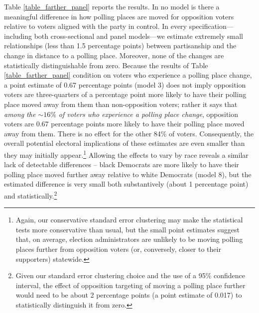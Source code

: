 \documentclass[12pt]{article}
\begin{document}
Table \ref{table_farther_panel} reports the results. In no model is there a meaningful difference in how polling places are moved for opposition voters relative to voters aligned with the party in control.  In every specification---including both cross-sectional and panel models---we estimate extremely small relationships (less than 1.5 percentage points) between partisanship and the change in distance to a polling place.  Moreover, none of the changes are statistically distinguishable from zero.  Because the results of Table \ref{table_farther_panel} condition on voters who experience a polling place change, a point estimate of 0.67 percentage points (model 3) does not imply opposition voters are three-quarters of a percentage point more likely to have their polling place moved away from them than non-opposition voters; rather it says that \emph{among the $\sim 16\%$ of voters who experience a polling place change}, opposition voters are 0.67 percentage points more likely to have their polling place moved away from them. There is no effect for the other 84\% of voters. Consequently, the overall potential electoral implications of these estimates are even smaller than they may initially appear.\footnote{Again, our conservative standard error clustering may make the statistical tests more conservative than usual, but the small point estimates suggest that, on average, election administrators are unlikely to be moving polling places further from opposition voters (or, conversely, closer to their supporters) statewide.} Allowing the effects to vary by race reveals a similar lack of detectable differences -- black Democrats are more likely to have their polling place moved further away relative to white Democrats (model 8), but the estimated difference is very small both substantively (about 1 percentage point) and statistically.\footnote{Given our standard error clustering choice and the use of a 95\% confidence interval, the effect of opposition targeting of moving a polling place further would need to be about 2 percentage points (a point estimate of 0.017) to statistically distinguish it from zero.}
\end{document}
